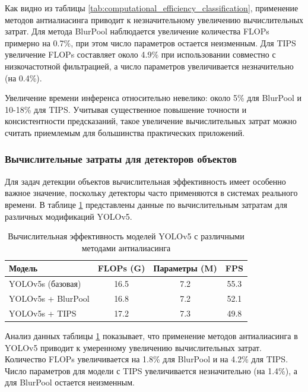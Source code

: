 Как видно из таблицы \ref{tab:computational_efficiency_classification}, применение методов антиалиасинга приводит к незначительному увеличению вычислительных затрат. Для метода BlurPool наблюдается увеличение количества FLOPs примерно на 0.7\%, при этом число параметров остается неизменным. Для TIPS увеличение FLOPs составляет около 4.9\% при использовании совместно с низкочастотной фильтрацией, а число параметров увеличивается незначительно (на 0.4\%).

Увеличение времени инференса относительно невелико: около 5\% для BlurPool и 10-18\% для TIPS. Учитывая существенное повышение точности и консистентности предсказаний, такое увеличение вычислительных затрат можно считать приемлемым для большинства практических приложений.

\subsubsection{Вычислительные затраты для детекторов объектов}

Для задач детекции объектов вычислительная эффективность имеет особенно важное значение, поскольку детекторы часто применяются в системах реального времени. В таблице \ref{tab:computational_efficiency_detection} представлены данные по вычислительным затратам для различных модификаций YOLOv5.

\begin{table}[h]
\centering
\caption{Вычислительная эффективность моделей YOLOv5 с различными методами антиалиасинга}
\label{tab:computational_efficiency_detection}
\begin{tabular}{lccc}
\toprule
\textbf{Модель} & \textbf{FLOPs (G)} & \textbf{Параметры (M)} & \textbf{FPS} \\
\midrule
YOLOv5s (базовая) & 16.5 & 7.2 & 55.3 \\
YOLOv5s + BlurPool & 16.8 & 7.2 & 52.1 \\
YOLOv5s + TIPS & 17.2 & 7.3 & 49.8 \\
\bottomrule
\end{tabular}
\end{table}

Анализ данных таблицы \ref{tab:computational_efficiency_detection} показывает, что применение методов антиалиасинга в YOLOv5 приводит к умеренному увеличению вычислительных затрат. Количество FLOPs увеличивается на 1.8\% для BlurPool и на 4.2\% для TIPS. Число параметров для модели с TIPS увеличивается незначительно (на 1.4\%), а для BlurPool остается неизменным.


